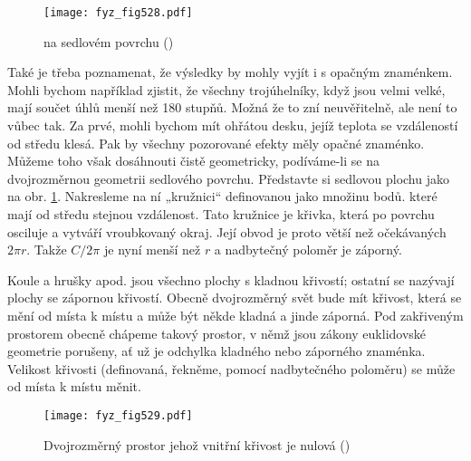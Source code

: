     \begin{figure}[ht!] %
      \centering
      \texttt{[image: fyz\_fig528.pdf]}
      \caption{ na sedlovém povrchu
               (\cite[s.~780]{Feynman02})}
      \label{fyz:fig528}
    \end{figure}
  
    Také je třeba poznamenat, že výsledky by mohly vyjít i s opačným znaménkem. Mohli bychom 
    například zjistit, že všechny trojúhelníky, když jsou velmi velké, mají součet úhlů menší než 
    \num{180} stupňů. Možná že to zní neuvěřitelně, ale není to vůbec tak. Za prvé, mohli bychom 
    mít ohřátou desku, jejíž teplota se vzdáleností od středu klesá. Pak by všechny pozorované 
    efekty měly opačné znaménko. Můžeme toho však dosáhnouti čistě geometricky, podíváme-li se na 
    dvojrozměrnou geometrii sedlového povrchu. Představte si sedlovou plochu jako na obr. 
    \ref{fyz:fig528}. Nakresleme na ní „kružnici“ definovanou jako množinu bodů. které mají od 
    středu stejnou vzdálenost. Tato kružnice je křivka, která po povrchu osciluje a vytváří 
    vroubkovaný okraj. Její obvod je proto větší než očekávaných \(2\pi r\). Takže \(C/2\pi\) je 
    nyní menší než \(r\) a nadbytečný  poloměr je záporný. 
    
    Koule a hrušky apod. jsou všechno plochy s kladnou křivostí; ostatní se nazývají plochy se 
    zápornou křivostí. Obecně dvojrozměrný svět bude mít křivost, která se mění od místa k místu a 
    může být někde kladná a jinde záporná. Pod zakřiveným prostorem obecně chápeme takový prostor, 
    v němž jsou zákony euklidovské geometrie porušeny, ať už je odchylka kladného nebo záporného 
    znaménka. Velikost křivosti (definovaná, řekněme, pomocí nadbytečného poloměru) se může od 
    místa k místu měnit.

    \begin{figure}[ht!] %
      \centering
      \texttt{[image: fyz\_fig529.pdf]}
      \caption{Dvojrozměrný prostor jehož vnitřní křivost je nulová
               (\cite[s.~781]{Feynman02})}
      \label{fyz:fig529}
    \end{figure}
  
